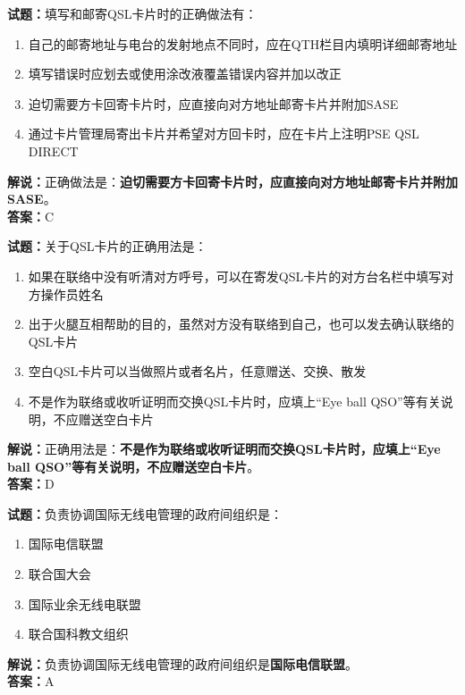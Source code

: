 \documentclass{ctexbook}
\begin{document}
\vspace{\baselineskip}

\noindent\textbf{试题：}填写和邮寄QSL卡片时的正确做法有：
\begin{enumerate}[leftmargin=3em]
  \item 自己的邮寄地址与电台的发射地点不同时，应在QTH栏目内填明详细邮寄地址
  \item 填写错误时应划去或使用涂改液覆盖错误内容并加以改正
  \item 迫切需要方卡回寄卡片时，应直接向对方地址邮寄卡片并附加SASE
  \item 通过卡片管理局寄出卡片并希望对方回卡时，应在卡片上注明PSE QSL DIRECT
\end{enumerate}
\noindent\textbf{解说：}正确做法是：\textbf{迫切需要方卡回寄卡片时，应直接向对方地址邮寄卡片并附加SASE}。\\\noindent\textbf{答案：}C

\vspace{\baselineskip}

\noindent\textbf{试题：}关于QSL卡片的正确用法是：
\begin{enumerate}[leftmargin=3em]
  \item 如果在联络中没有听清对方呼号，可以在寄发QSL卡片的对方台名栏中填写对方操作员姓名
  \item 出于火腿互相帮助的目的，虽然对方没有联络到自己，也可以发去确认联络的QSL卡片
  \item 空白QSL卡片可以当做照片或者名片，任意赠送、交换、散发
  \item 不是作为联络或收听证明而交换QSL卡片时，应填上“Eye ball QSO”等有关说明，不应赠送空白卡片
\end{enumerate}
\noindent\textbf{解说：}正确用法是：\textbf{不是作为联络或收听证明而交换QSL卡片时，应填上“Eye ball QSO”等有关说明，不应赠送空白卡片}。\\\noindent\textbf{答案：}D

\vspace{\baselineskip}

\noindent\textbf{试题：}负责协调国际无线电管理的政府间组织是：
\begin{enumerate}[leftmargin=3em]
  \item 国际电信联盟
  \item 联合国大会
  \item 国际业余无线电联盟
  \item 联合国科教文组织
\end{enumerate}
\noindent\textbf{解说：}负责协调国际无线电管理的政府间组织是\textbf{国际电信联盟}。\\\noindent\textbf{答案：}A
\end{document}
